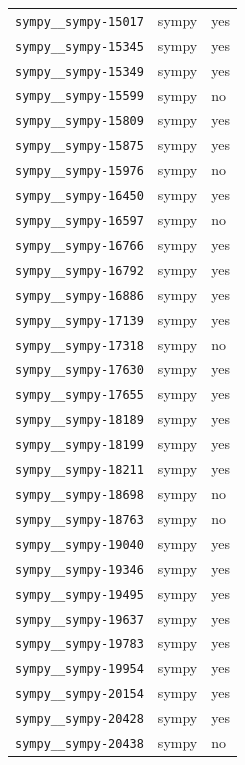 \begin{longtable}{@{}p{}lp{}@{}}
\texttt{sympy\_\_sympy-15017} & sympy & yes \\
\texttt{sympy\_\_sympy-15345} & sympy & yes \\
\texttt{sympy\_\_sympy-15349} & sympy & yes \\
\texttt{sympy\_\_sympy-15599} & sympy & no \\
\texttt{sympy\_\_sympy-15809} & sympy & yes \\
\texttt{sympy\_\_sympy-15875} & sympy & yes \\
\texttt{sympy\_\_sympy-15976} & sympy & no \\
\texttt{sympy\_\_sympy-16450} & sympy & yes \\
\texttt{sympy\_\_sympy-16597} & sympy & no \\
\texttt{sympy\_\_sympy-16766} & sympy & yes \\
\texttt{sympy\_\_sympy-16792} & sympy & yes \\
\texttt{sympy\_\_sympy-16886} & sympy & yes \\
\texttt{sympy\_\_sympy-17139} & sympy & yes \\
\texttt{sympy\_\_sympy-17318} & sympy & no \\
\texttt{sympy\_\_sympy-17630} & sympy & yes \\
\texttt{sympy\_\_sympy-17655} & sympy & yes \\
\texttt{sympy\_\_sympy-18189} & sympy & yes \\
\texttt{sympy\_\_sympy-18199} & sympy & yes \\
\texttt{sympy\_\_sympy-18211} & sympy & yes \\
\texttt{sympy\_\_sympy-18698} & sympy & no \\
\texttt{sympy\_\_sympy-18763} & sympy & no \\
\texttt{sympy\_\_sympy-19040} & sympy & yes \\
\texttt{sympy\_\_sympy-19346} & sympy & yes \\
\texttt{sympy\_\_sympy-19495} & sympy & yes \\
\texttt{sympy\_\_sympy-19637} & sympy & yes \\
\texttt{sympy\_\_sympy-19783} & sympy & yes \\
\texttt{sympy\_\_sympy-19954} & sympy & yes \\
\texttt{sympy\_\_sympy-20154} & sympy & yes \\
\texttt{sympy\_\_sympy-20428} & sympy & yes \\
\texttt{sympy\_\_sympy-20438} & sympy & no \\

\end{longtable}
